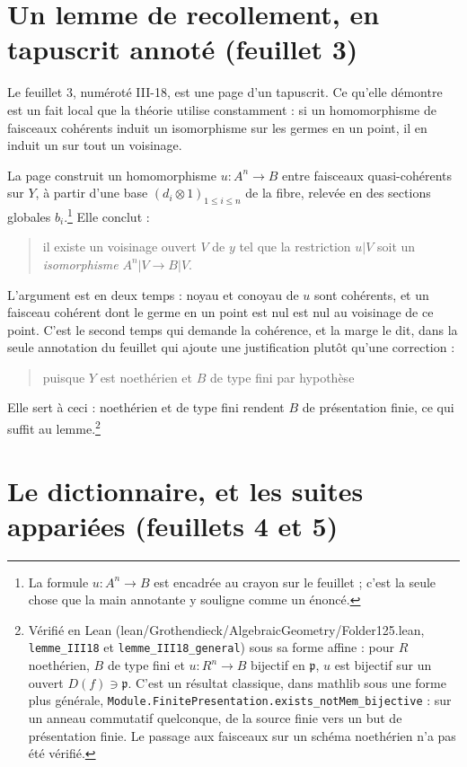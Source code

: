 \documentclass[11pt,a4paper]{article}
\begin{document}
\section*{Un lemme de recollement, en tapuscrit annoté (feuillet 3)}

Le feuillet 3, numéroté III-18, est une page d'un tapuscrit. Ce qu'elle
démontre est un fait local que la théorie utilise constamment : si un
homomorphisme de faisceaux cohérents induit un isomorphisme sur les germes en
un point, il en induit un sur tout un voisinage.

La page construit un homomorphisme $u : A^{n} \to B$ entre faisceaux
quasi-cohérents sur $Y$, à partir d'une base
$(d_{i} \otimes 1)_{1 \leqslant i \leqslant n}$ de la fibre, relevée en des
sections globales $b_{i}$.\footnote{La formule $u : A^{n} \to B$ est encadrée
au crayon sur le feuillet ; c'est la seule chose que la main annotante y
souligne comme un énoncé.} Elle conclut :

\begin{quote}
il existe un voisinage ouvert $V$ de $y$ tel que la restriction $u|V$ soit un
\emph{isomorphisme} $A^{n}|V \to B|V$.
\end{quote}

L'argument est en deux temps : noyau et conoyau de $u$ sont cohérents, et un
faisceau cohérent dont le germe en un point est nul est nul au voisinage de ce
point. C'est le second temps qui demande la cohérence, et la marge le dit, dans la seule annotation du
feuillet qui ajoute une justification plutôt qu'une correction :

\begin{quote}
puisque $Y$ est noethérien et $B$ de type fini par hypothèse
\end{quote}
Elle sert à ceci : noethérien et de type fini rendent $B$ de
présentation finie, ce qui suffit au lemme.\footnote{Vérifié en
Lean (lean/Grothendieck/AlgebraicGeometry/Folder125.lean, \texttt{lemme\_III18} et
\texttt{lemme\_III18\_general}) sous sa forme affine : pour $R$ noethérien,
$B$ de type fini et $u : R^{n} \to B$ bijectif en $\mathfrak{p}$, $u$ est
bijectif sur un ouvert $D(f) \ni \mathfrak{p}$. C'est un résultat classique,
dans mathlib sous une forme plus générale,
\texttt{Module.FinitePresentation.exists\_notMem\_bijective} : sur un anneau
commutatif quelconque, de la source finie vers un but de présentation finie.
Le passage aux faisceaux sur un schéma noethérien n'a pas été vérifié.}

\section*{Le dictionnaire, et les suites appariées (feuillets 4 et 5)}
\end{document}
